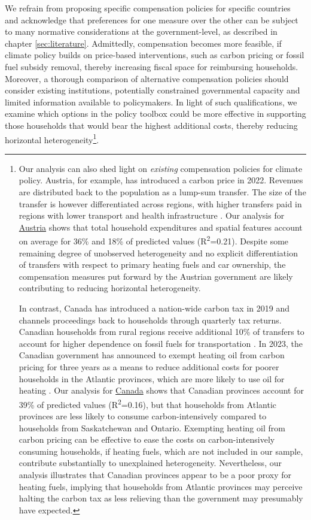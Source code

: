 \documentclass[12pt, a4paper]{article}
\begin{document}
We refrain from proposing specific compensation policies for specific countries and acknowledge that preferences for one measure over the other can be subject to many normative considerations at the government-level, as described in chapter \ref{sec:literature}. Admittedly, compensation becomes more feasible, if climate policy builds on price-based interventions, such as carbon pricing or fossil fuel subsidy removal, thereby increasing fiscal space for reimbursing households. Moreover, a thorough comparison of alternative compensation policies should consider existing institutions, potentially constrained governmental capacity and limited information available to policymakers. In light of such qualifications, we examine which options in the policy toolbox could be more effective in supporting those households that would bear the highest additional costs, thereby reducing horizontal heterogeneity\footnote{Our analysis can also shed light on \textit{existing} compensation policies for climate policy. Austria, for example, has introduced a carbon price in 2022. Revenues are distributed back to the population as a lump-sum transfer. The size of the transfer is however differentiated across regions, with higher transfers paid in regions with lower transport and health infrastructure \autocite{BMK.2023}. Our analysis for \hyperref[fig:5b_AUT]{Austria} shows that total household expenditures and spatial features account on average for 36\% and 18\% of predicted values (R\textsuperscript{2}=0.21). Despite some remaining degree of unobserved heterogeneity and no explicit differentiation of transfers with respect to primary heating fuels and car ownership, the compensation measures put forward by the Austrian government are likely contributing to reducing horizontal heterogeneity.

In contrast, Canada has introduced a nation-wide carbon tax in 2019 and channels proceedings back to households through quarterly tax returns. Canadian households from rural regions receive additional 10\% of transfers to account for higher dependence on fossil fuels for transportation \autocite{GovernmentofCanada.2023}. In 2023, the Canadian government has announced to exempt heating oil from carbon pricing for three years as a means to reduce additional costs for poorer households in the Atlantic provinces, which are more likely to use oil for heating \autocite{Reuters.2023}. Our analysis for \hyperref[fig:5b_CAN]{Canada} shows that Canadian provinces account for 39\% of predicted values (R\textsuperscript{2}=0.16), but that households from Atlantic provinces are less likely to consume carbon-intensively compared to households from Saskatchewan and Ontario. Exempting heating oil from carbon pricing can be effective to ease the costs on carbon-intensively consuming households, if heating fuels, which are not included in our sample, contribute substantially to unexplained heterogeneity. Nevertheless, our analysis illustrates that Canadian provinces appear to be a poor proxy for heating fuels, implying that households from Atlantic provinces may perceive halting the carbon tax as less relieving than the government may presumably have expected.}.
\end{document}
